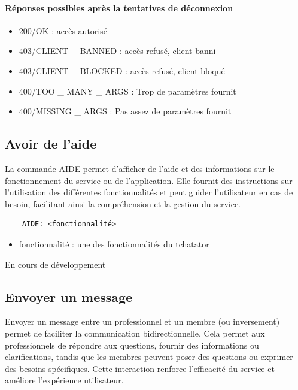 \documentclass{report}
\begin{document}
\paragraph{Réponses possibles après la tentatives de déconnexion}

\begin{itemize}
	\item 200/OK : accès autorisé
	\item 403/CLIENT \_ BANNED : accès refusé, client banni
	\item 403/CLIENT \_ BLOCKED : accès refusé, client bloqué
	\item 400/TOO \_ MANY \_ ARGS : Trop de paramètres fournit
	\item 400/MISSING \_ ARGS : Pas assez de paramètres fournit
\end{itemize}

\subsection{Avoir de l’aide}

La commande AIDE permet d'afficher de l'aide et des informations sur le fonctionnement du service ou de l'application. Elle fournit des instructions sur l'utilisation des différentes fonctionnalités et peut guider l'utilisateur en cas de besoin, facilitant ainsi la compréhension et la gestion du service.

\begin{verbatim}
	AIDE: <fonctionnalité>
\end{verbatim}

\begin{itemize}
	\item fonctionnalité : une des fonctionnalités du tchatator
\end{itemize}

En cours de développement

\subsection{Envoyer un message}

Envoyer un message entre un professionnel et un membre (ou inversement) permet de faciliter la communication bidirectionnelle. Cela permet aux professionnels de répondre aux questions, fournir des informations ou clarifications, tandis que les membres peuvent poser des questions ou exprimer des besoins spécifiques. Cette interaction renforce l'efficacité du service et améliore l'expérience utilisateur.
\end{document}
